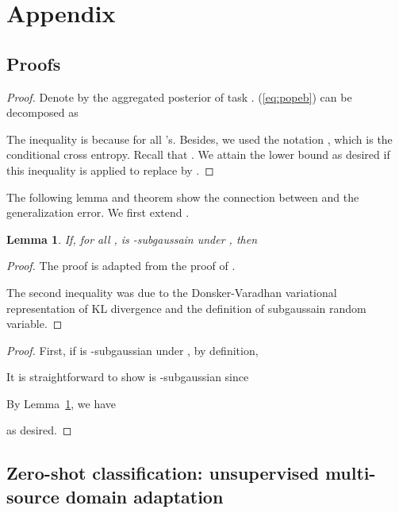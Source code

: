 \documentclass{article} \usepackage{iclr2020_conference,times}
\def\eqref#1{(\ref{#1})}
\newtheorem{lemm}{Lemma}
\begin{document}




\appendix
\section*{Appendix}
\renewcommand{\thesubsection}{\Alph{subsection}}

\subsection{Proofs}

\ebibt
\begin{proof}
    Denote by  the aggregated posterior of task .
    \eqref{eq:popeb} can be decomposed as

    The inequality is because  for all 's.
    Besides, we used the notation , which is the conditional cross entropy. Recall that .
    We attain the lower bound as desired if this inequality is applied to replace  by .
\end{proof}

The following lemma and theorem show the connection between  and the generalization error.
We first extend \citet[Lemma 4.2]{xu2016information}.
\begin{lemm} 
    \label{thm:subg}
    If, for all ,  is -subgaussain under , then 
    
\end{lemm}
\begin{proof}
    The proof is adapted from the proof of \citet[Lemma 4.2]{xu2016information}.
    
    The second inequality was due to the Donsker-Varadhan variational representation of KL divergence and the definition of subgaussain random variable.
\end{proof}

\genmi
\begin{proof}
    First, if  is -subgaussian under , by definition,
    
    It is straightforward to show  is -subgaussian since
    
    By Lemma~\ref{thm:subg}, we have
    
    as desired.
\end{proof}






\subsection{Zero-shot classification: unsupervised multi-source domain adaptation}
\end{document}
